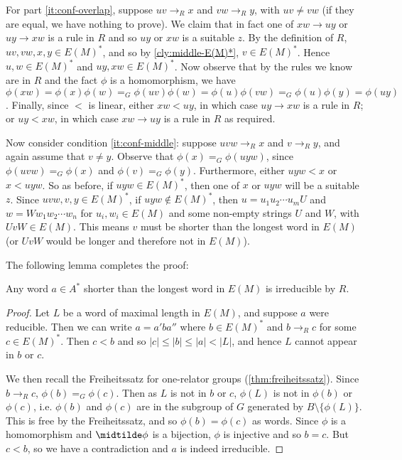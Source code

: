 \documentclass[noindex,noinsetproof,12pt]{lmaths}
\begin{document}
For part \ref{it:conf-overlap}, suppose $uv \to_R x$ and $vw \to_R y$, with $uv \ne vw$ (if they are equal, we have nothing to prove). We claim that in fact one of $xw \to uy$ or $uy \to xw$ is a rule in $R$ and so $uy$ or $xw$ is a suitable $z$. By the definition of $R$, $uv, vw, x, y\in E(M)^*$, and so by \cref{cly:middle-E(M)*}, $v \in E(M)^*$. Hence $u, w \in E(M)^*$ and $uy, xw \in E(M)^*$. Now observe that by the rules we know are in $R$ and the fact $\phi$ is a homomorphism, we have $\phi(xw) = \phi(x)\phi(w) =_G \phi(uv)\phi(w) = \phi(u)\phi(vw) =_G \phi(u)\phi(y) = \phi(uy)$. Finally, since $<$ is linear, either $xw < uy$, in which case $uy \to xw$ is a rule in $R$; or $uy < xw$, in which case $xw \to uy$ is a rule in $R$ as required.

Now consider condition \ref{it:conf-middle}: suppose $uvw \to_R x$ and $v \to_R y$, and again assume that $v \ne y$. Observe that $\phi(x) =_G \phi(uyw)$, since $\phi(uvw) =_G \phi(x)$ and $\phi(v) =_G \phi(y)$. Furthermore, either $uyw < x$ or $x < uyw$. So as before, if $uyw \in E(M)^*$, then one of $x$ or $uyw$ will be a suitable $z$. Since $uvw, v, y \in E(M)^*$, if $uyw \not\in E(M)^*$, then $u = u_1u_2 \cdots u_m U$ and $w = W w_1 w_2 \cdots w_n$ for $u_i, w_i \in E(M)$ and some non-empty strings $U$ and $W$, with $UvW \in E(M)$. This means $v$ must be shorter than the longest word in $E(M)$ (or $UvW$ would be longer and therefore not in $E(M)$).

The following lemma completes the proof:

\begin{lemma} \label{lma:shorter-irreducible}
	Any word $a \in A^*$ shorter than the longest word in $E(M)$ is irreducible by $R$.
\end{lemma}
\begin{proof}
	Let $L$ be a word of maximal length in $E(M)$, and suppose $a$ were reducible. Then we can write $a = a'ba''$ where $b \in E(M)^*$ and $b \to_R c$ for some $c \in E(M)^*$. Then $c < b$ and so $|c| \le |b| \le |a| < |L|$, and hence $L$ cannot appear in $b$ or $c$.
	
	We then recall the Freiheitssatz for one-relator groups (\cref{thm:freiheitssatz}).	Since $b \to_R c$, $\phi(b) =_G \phi(c)$. Then as $L$ is not in $b$ or $c$, $\phi(L)$ is not in $\phi(b)$ or $\phi(c)$, i.e. $\phi(b)$ and $\phi(c)$ are in the subgroup of $G$ generated by $B \setminus \{\phi(L)\}$. This is free by the Freiheitssatz, and so $\phi(b) = \phi(c)$ as words. Since $\phi$ is a homomorphism and $\midtilde\phi$ is a bijection, $\phi$ is injective and so $b = c$. But $c < b$, so we have a contradiction and $a$ is indeed irreducible.
\end{proof}
\end{document}
